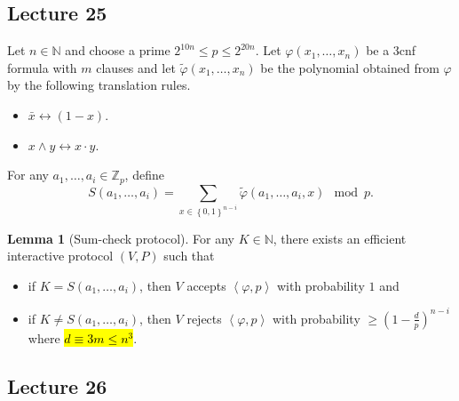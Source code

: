 \documentclass[10pt,letterpaper,cm]{nupset}
\theoremstyle{definition}
\theoremstyle{theorem}
\newtheorem{lemma}[definition]{Lemma}
\theoremstyle{remark}
\newcommand{\N}{\mathbb N}
\newcommand{\Z}{\mathbb Z}
\newcommand{\1}{\mathbf{1}}
\newcommand{\0}{\vec 0}
\begin{document}
\subsection{Lecture 25}

Let $n\in \N$ and choose a prime $2^{10n}\leq p\leq 2^{20n}$. Let  $\varphi(x_1, \ldots, x_n)$ be a 3cnf formula with $m$ clauses and let $\tilde{\varphi}(x_1, \ldots, x_n)$ be the polynomial obtained from $\varphi$ by the following translation rules.
\begin{itemize}
\item $\bar{x} \longleftrightarrow (1-x)$.
\item $x \land y \longleftrightarrow x \cdot y$.
\end{itemize} 
For any $a_1, \ldots, a_i \in \Z_p$, define $$S(a_1, \ldots, a_i) = \sum_{x\in \left\{0,1\right\}^{n-i}} \tilde{\varphi}(a_1, \ldots, a_i, x) \mod p.$$ 

\begin{lemma}[Sum-check protocol]\label{SCP}
For any $K\in \N$, there exists an efficient interactive protocol $\left(V, P\right)$ such that 
\begin{itemize}
\item if $K =S(a_1, \ldots, a_i)$, then $V$ accepts $\left\langle \varphi, p \right\rangle$ with probability $1$ and
\item if $K \ne S(a_1, \ldots, a_i)$, then $V$ rejects $\left\langle \varphi, p \right\rangle$ with probability $\geq \left(1-\frac{d}{p}\right)^{n-i}$ where \hl{$d \equiv 3m\leq n^3$}.
\end{itemize}
\end{lemma}


\subsection{Lecture 26}
\end{document}
